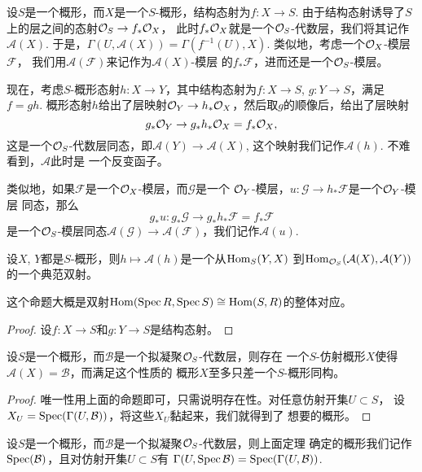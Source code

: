 \begin{para}
	设$S$是一个概形，而$X$是一个$S$-概形，结构态射为$f:X\to S$. 
	由于结构态射诱导了$S$上的层之间的态射$\mathcal{O}_S\to f_*\mathcal{O}_X$，
	此时$f_*\mathcal{O}_X$就是一个$\mathcal{O}_S$-代数层，我们将其记作
	$\mathcal A(X)$. 于是，$\Gamma(U,\mathcal A(X))=\Gamma(
	f^{-1}(U),X)$. 类似地，考虑一个$\mathcal{O}_X$-模层$\mathcal F$，
	我们用$\mathcal A(\mathcal F)$来记作为$\mathcal A(X)$-模层
	的$f_*\mathcal F$，进而还是一个$\mathcal{O}_S$-模层。

	现在，考虑$S$-概形态射$h:X\to Y$，其中结构态射为$f:X\to S$, 
	$g:Y\to S$，满足$f=gh$. 概形态射$h$给出了层映射$\mathcal{O}_Y\to
	h_*\mathcal{O}_X$，然后取$g$的顺像后，给出了层映射
	\[
		g_*\mathcal{O}_Y\to g_*h_*\mathcal{O}_X=f_*\mathcal{O}_X,
	\]
	这是一个$\mathcal{O}_S$-代数层同态，即$\mathcal A(Y)\to \mathcal A(X)$,
	这个映射我们记作$\mathcal A(h)$. 不难看到，$\mathcal A$此时是
	一个反变函子。

	类似地，如果$\mathcal F$是一个$\mathcal{O}_X$-模层，而$\mathcal G$是一个
	$\mathcal{O}_Y$-模层，$u:\mathcal G\to h_*\mathcal F$是一个$\mathcal{O}_Y$-模层
	同态，那么
	\[
		g_*u:g_*\mathcal G\to g_*h_*\mathcal F=f_*\mathcal F
	\]
	是一个$\mathcal{O}_S$-模层同态$\mathcal A(\mathcal G)\to \mathcal A
	(\mathcal F)$，我们记作$\mathcal A(u)$. 
\end{para}

\begin{pro}
设$X$, $Y$都是$S$-概形，则$h\mapsto \mathcal A(h)$是一个从$\operatorname{Hom}_S(Y,X)$
到$\operatorname{Hom}_{\mathcal{O}_S}(\mathcal A(X),\mathcal A(Y))$的一个典范双射。
\end{pro}

这个命题大概是双射$\operatorname{Hom}(\operatorname{Spec} R,\operatorname{Spec} S)\cong \operatorname{Hom}(S,R)$的整体对应。

\begin{proof}
设$f:X\to S$和$g:Y\to S$是结构态射。\notprove
\end{proof}

\begin{thm}\label{thm:4.3.5}
设$S$是一个概形，而$\mathcal B$是一个拟凝聚$\mathcal{O}_S$-代数层，则存在
一个$S$-仿射概形$X$使得$\mathcal A(X)=\mathcal B$，而满足这个性质的
概形$X$至多只差一个$S$-概形同构。
\end{thm}

\begin{proof}
唯一性用上面的命题即可，只需说明存在性。对任意仿射开集$U\subset S$，
设$X_U=\operatorname{Spec}(\Gamma(U,\mathcal B))$，将这些$X_U$黏起来，我们就得到了
想要的概形。\notprove
\end{proof}

\begin{para}[整体谱]
设$S$是一个概形，而$\mathcal B$是一个拟凝聚$\mathcal{O}_S$-代数层，则上面定理
确定的概形我们记作$\operatorname{Spec} (\mathcal B)$，且对仿射开集$U\subset S$有
$\Gamma(U,\operatorname{Spec} \mathcal B)=\operatorname{Spec} (\Gamma(U,\mathcal B))$. 
\end{para}

